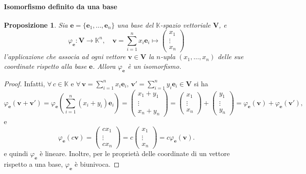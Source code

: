 \documentclass{article}
\theoremstyle{plain}
\newtheorem{prop}[thm]{Proposizione}
\theoremstyle{definition}
\theoremstyle{remark}
\begin{document}
\paragraph{Isomorfismo definito da una base}
\begin{bxthm}
\begin{prop}
Sia $\mathbf{e}=\{\mathbf{e}_1, \ldots, \mathbf{e}_n\}$ una base del $\mathbb{K}$-spazio vettoriale $\mathbf{V}$, e 
\[ \varphi_\mathbf{e}:\mathbf{V}\to\mathbb{K}^n,\quad \mathbf{v}=\sum_{i=1}^{n}x_i\mathbf{e}_i\mapsto\begin{pmatrix}x_1\\\vdots\\x_n\end{pmatrix} \]
l'applicazione che associa ad ogni vettore $\mathbf{v}\in\mathbf{V}$ la $n$-upla
$(x_1,\ldots,x_n)$ delle sue coordinate rispetto alla base $\mathbf{e}$.
Allora $\varphi_\mathbf{e}$ è un isomorfismo. 
\end{prop}
\end{bxthm}
\begin{proof}
    Infatti, $\forall\,c\in\mathbb{K}$ e $\forall\,\mathbf{v}=\sum_{i=1}^{n}x_i\mathbf{e}_i,\,\mathbf{v}'=\sum_{i=1}^{n}y_i\mathbf{e}_i\in\mathbf{V}$
    si ha 
    \[\varphi_\mathbf{e}(\mathbf{v}+\mathbf{v}')=\varphi_\mathbf{e}\left(\sum_{i=1}^{n}(x_i+y_i)\mathbf{e}_i\right)=\begin{pmatrix}x_1+y_1\\\vdots\\x_n+y_n\end{pmatrix}=\begin{pmatrix}x_1\\\vdots\\x_n\end{pmatrix}+\begin{pmatrix}y_1\\\vdots\\y_n\end{pmatrix}=\varphi_\mathbf{e}(\mathbf{v})+\varphi_\mathbf{e}(\mathbf{v}'),\]
    e 
    \[\varphi_\mathbf{e}(c\mathbf{v})=\begin{pmatrix}cx_1\\\vdots\\cx_n\end{pmatrix}=c\begin{pmatrix}x_1\\\vdots\\x_n\end{pmatrix}=c\varphi_\mathbf{e}(\mathbf{v}).\]
    e quindi $\varphi_\mathbf{e}$ è lineare. 
    Inoltre, per le proprietà delle coordinate di un vettore rispetto a una base, $\varphi_\mathbf{e}$ è biunivoca.
\end{proof}
\end{document}
